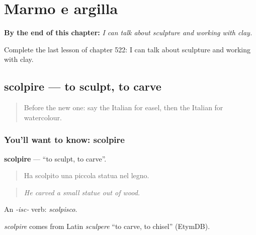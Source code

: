 
\chapter{Marmo e argilla}
\label{ch:it-marmo-e-argilla}

\begin{chapteropening}
\textbf{By the end of this chapter:} \emph{I can talk about sculpture and working with clay.}

Complete the last lesson of chapter 522: I can talk about sculpture and working with clay.
\end{chapteropening}

\section[scolpire]{scolpire — to sculpt, to carve}

\label{lesson:IT-C522-scolpire}



\begin{quote}
Before the new one: say the Italian for easel, then the Italian for watercolour.
\end{quote}

\subsection*{You'll want to know: scolpire}
\textbf{scolpire} — \textquotedblleft{}to sculpt, to carve\textquotedblright{}.

\begin{quote}
Ha scolpito una piccola statua nel legno.
\end{quote}

\begin{quote}
\emph{He carved a small statue out of wood.}
\end{quote}

An \emph{-isc-} verb: \emph{scolpisco}.

\begin{cousinweb}
\emph{scolpire} comes from Latin \emph{sculpere} \textquotedblleft{}to carve, to chisel\textquotedblright{} (EtymDB).
\end{cousinweb}

